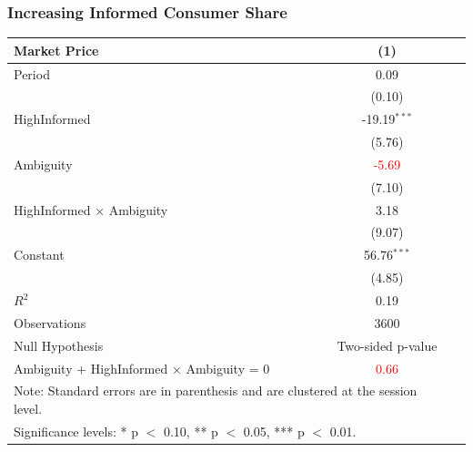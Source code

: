 \documentclass[red]{beamer}
\begin{document}
\begin{frame}
\frametitle{Increasing Informed Consumer Share}
\newcommand{\adv}[1]{ {\color{blue} #1} }
\begin{table}[htbp]\centering
 \begin{adjustbox}{width=10cm, totalheight=7cm}
\begin{tabular}{l*{2}{c}}
\hline\hline
Market Price  & (1) & \\
\hline
Period                                      &  0.09 & \\
                                            &  (0.10) & \\
HighInformed                                &  \adv{ -19.19$^{***}$} &\\
                                            &  (5.76)& \\
Ambiguity                                &  \textcolor{red}{-5.69} &\\
                                            &  (7.10) & \\
HighInformed $\times$ Ambiguity   & 3.18 & \\
                                            &  (9.07) &\\
Constant                                    & 56.76$^{***}$ & \\
                                            &  (4.85) & \\
\hline 
\vspace{2mm}
$R^2$                                       & 0.19 &  \\
Observations                                &   3600 &  \\
\hline\hline
Null Hypothesis                             & Two-sided p-value \\
\hline
Ambiguity + HighInformed  $\times$ Ambiguity = 0 & \textcolor{red}{0.66} \\
\hline
\multicolumn{2}{l}{\footnotesize{Note: Standard errors are in parenthesis and are clustered at the session level.}} \\
\multicolumn{2}{l}{\footnotesize{Significance levels: * p $<$ 0.10, ** p $<$ 0.05, *** p $<$ 0.01.}}
\end{tabular} \\ \vspace{3mm}
 \end{adjustbox}
\end{table}
\end{frame}
\end{document}
